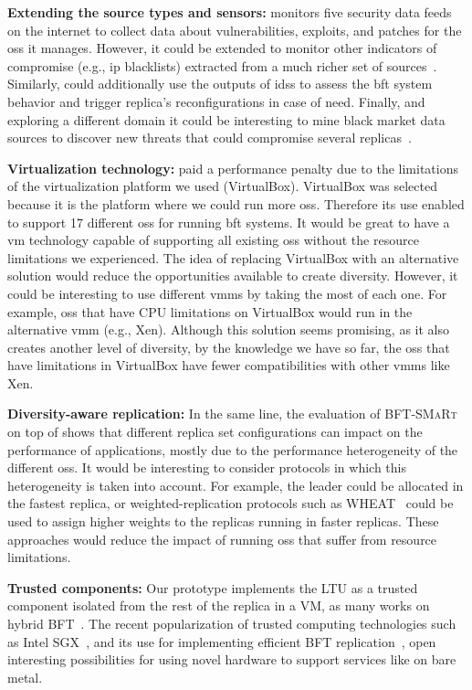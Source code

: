 \textbf{Extending the \system source types and sensors:}
\system monitors five security data feeds on the internet to collect data about vulnerabilities, exploits, and patches for the \glspl{os} it manages.
However, it could be extended to monitor other indicators of compromise (e.g., \gls{ip} blacklists) extracted from a much richer set of sources~\cite{Liao:2016,Sabottke:2015}.
Similarly, \system could additionally use the outputs of \glspl{ids} to assess the \gls{bft} system behavior and trigger replica's reconfigurations in case of need.
Finally, and exploring a different domain it could be interesting to mine black market data sources to discover new threats that could compromise several replicas~\cite{Allodi:2014}.


\textbf{Virtualization technology:}
\system paid a performance penalty due to the limitations of the virtualization platform we used (VirtualBox).
VirtualBox was selected because it is the platform where we could run more \glspl{os}.
Therefore its use enabled \system to support 17 different \glspl{os} for running \gls{bft} systems.
It would be great to have a \gls{vm} technology capable of supporting all existing \glspl{os} without the resource limitations we experienced.
The idea of replacing VirtualBox with an alternative solution would reduce the opportunities available to create diversity.
However, it could be interesting to use different \glspl{vmm} by taking the most of each one. 
For example, \glspl{os} that have CPU limitations on VirtualBox would run in the alternative \gls{vmm} (e.g., Xen).
Although this solution seems promising, as it also creates another level of diversity, by the knowledge we have so far, the \glspl{os} that have limitations in VirtualBox have fewer compatibilities with other \glspl{vmm} like Xen.

\textbf{Diversity-aware replication:}
In the same line, the evaluation of \textsc{BFT-SMaRt} on top of \system shows that different replica set configurations can impact on the performance of applications, mostly due to the performance heterogeneity of the different \glspl{os}.
It would be interesting to consider protocols in which this heterogeneity is taken into account.
For example, the leader could be allocated in the fastest replica, or weighted-replication protocols such as WHEAT~\cite{Sousa:2015} could be used to assign higher weights to the replicas running in faster replicas.
These approaches would reduce the impact of running \glspl{os} that suffer from resource limitations.


\textbf{Trusted components:}
Our prototype implements the LTU as a trusted component isolated from the rest of the replica in a VM, as many works on hybrid BFT~\cite{Veronese:2013,Roeder:2010,Platania:2014,Sousa:2010,Distler:2011}.
The recent popularization of trusted computing technologies such as Intel SGX~\cite{sgx}, and its use for implementing efficient BFT replication~\cite{Behl:2017}, open interesting possibilities for using novel hardware to support services like \system on bare metal.





